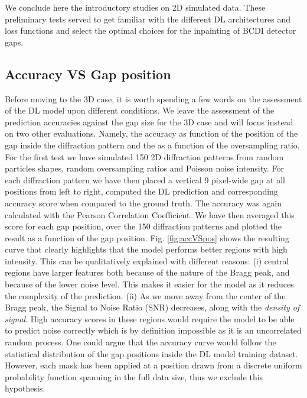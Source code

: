 We conclude here the introductory studies on 2D simulated data. These preliminary tests served to get familiar with 
the different DL architectures and loss functions and select the optimal choices for the inpainting of BCDI detector
gaps. 

\subsection{Accuracy VS Gap position}

Before moving to the 3D case, it is worth spending a few words on the assessment of the DL model upon different conditions.
We leave the assessment of the prediction accuracies against the gap size for the 3D case and will focus instead on two
other evaluations. Namely, the accuracy as function of the position of the gap inside the diffraction pattern and the 
as a function of the oversampling ratio.
For the first test we have simulated 150 2D diffraction patterns from random particles shapes, random oversampling ratios
and Poisson noise intensity. For each diffraction pattern we have then placed a vertical 9 pixel-wide gap at all positions
from left to right, computed the DL prediction and corresponding accuracy score when compared to the ground truth. The 
accuracy was again calculated with the Pearson Correlation Coefficient. We have then averaged this score for each 
gap position, over the 150 diffraction patterns and plotted the result as a function of the gap position. Fig. \ref{fig:accVSpos} 
shows the resulting curve that clearly highlights that the model performs better regions with high intensity. 
This can be qualitatively explained with different reasons: (i) central regions have larger features both because of the 
nature of the Bragg peak, and because of the lower noise level. This makes it easier for the model as it reduces the 
complexity of the prediction. (ii) As we move away from the center of the Bragg peak, the Signal to Noise Ratio (SNR) 
decreases, along with the \textit{density of signal}. High accuracy scores in these regions would require the model to be 
able to predict noise correctly which is by definition impossible as it is an uncorrelated random process. One could argue 
that the accuracy curve would follow the statistical distribution of the gap positions inside the DL model training dataset.
However, each mask has been applied at a position drawn from a discrete uniform probability function spanning in the full
data size, thus we exclude this hypothesis. 

